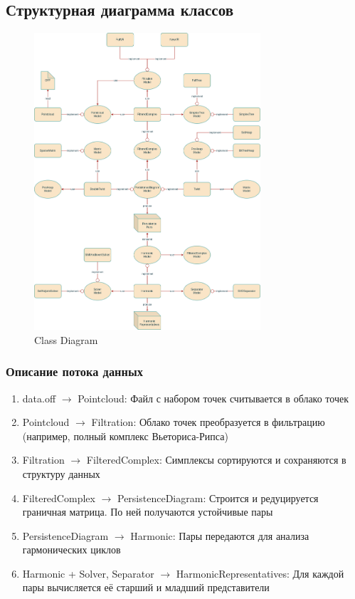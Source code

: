 \documentclass{article}
\begin{document}
\subsection{Структурная диаграмма классов}

\begin{figure}[ht]
  \centering
  \includegraphics[width=0.75\textwidth]{images/class_diagram.png}
  \caption{Class Diagram}
  \label{fig:class_diagram}
\end{figure}
\clearpage

\subsubsection*{Описание потока данных}

\begin{enumerate}
  \item data.off $\rightarrow$ Pointcloud: Файл с набором точек считывается в облако точек
  \item Pointcloud $\rightarrow$ Filtration: Облако точек преобразуется в фильтрацию (например, полный комплекс Вьеториса-Рипса)
  \item Filtration $\rightarrow$ FilteredComplex: Симплексы сортируются и сохраняются в структуру данных
  \item FilteredComplex $\rightarrow$ PersistenceDiagram: Строится и редуцируется граничная матрица. По ней получаются устойчивые пары
  \item PersistenceDiagram $\rightarrow$ Harmonic: Пары передаются для анализа гармонических циклов
  \item Harmonic + Solver, Separator $\rightarrow$ HarmonicRepresentatives: Для каждой пары вычисляется её старший и младший представители
\end{enumerate}
\end{document}
